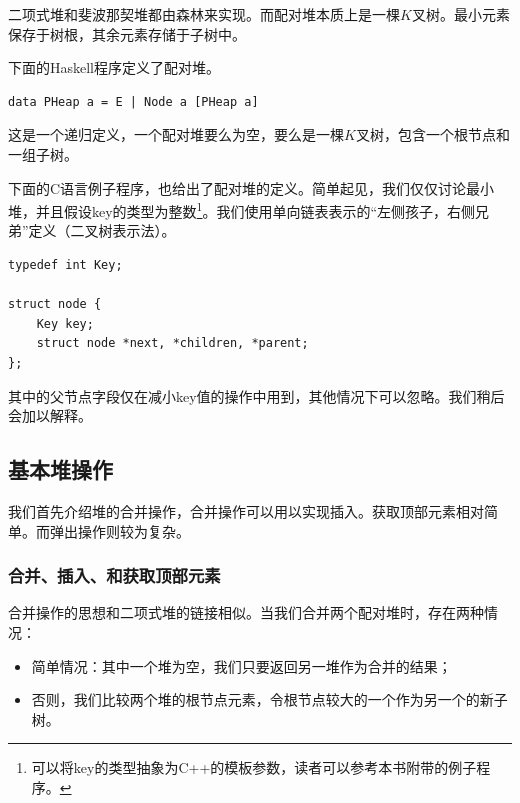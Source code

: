 \documentclass[b5paper]{ctexart}
\begin{document}
二项式堆和斐波那契堆都由森林来实现。而配对堆本质上是一棵$K$叉树。最小元素保存于树根，其余元素存储于子树中。

下面的Haskell程序定义了配对堆。

\lstset{language=Haskell}
\begin{lstlisting}[style=Haskell]
data PHeap a = E | Node a [PHeap a]
\end{lstlisting}

这是一个递归定义，一个配对堆要么为空，要么是一棵$K$叉树，包含一个根节点和一组子树。

下面的C语言例子程序，也给出了配对堆的定义。简单起见，我们仅仅讨论最小堆，并且假设key的类型为整数\footnote{可以将key的类型抽象为C++的模板参数，读者可以参考本书附带的例子程序。}。我们使用单向链表表示的“左侧孩子，右侧兄弟”定义（二叉树表示法\cite{CLRS}）。

\lstset{language=C}
\begin{lstlisting}
typedef int Key;

struct node {
    Key key;
    struct node *next, *children, *parent;
};
\end{lstlisting}

其中的父节点字段仅在减小key值的操作中用到，其他情况下可以忽略。我们稍后会加以解释。


\subsection{基本堆操作}

我们首先介绍堆的合并操作，合并操作可以用以实现插入。获取顶部元素相对简单。而弹出操作则较为复杂。

\subsubsection{合并、插入、和获取顶部元素}
 

合并操作的思想和二项式堆的链接相似。当我们合并两个配对堆时，存在两种情况：

\begin{itemize}
\item 简单情况：其中一个堆为空，我们只要返回另一堆作为合并的结果；

\item 否则，我们比较两个堆的根节点元素，令根节点较大的一个作为另一个的新子树。
\end{itemize}
\end{document}
